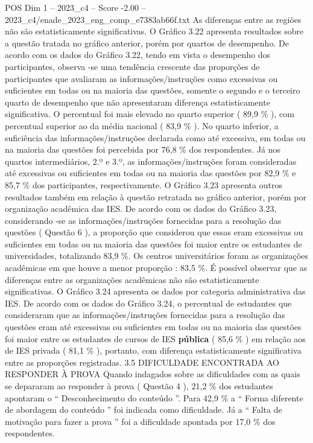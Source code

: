 \begin{textsample}{POS Dim 1 – 2023\_c4 – Score -2.00 – 2023\_c4/enade\_2023\_eng\_comp\_e7383ab66f.txt}
As diferenças entre as regiões não são estatisticamente significativas.
O Gráfico 3.22 apresenta resultados sobre a questão tratada no gráfico anterior, porém por quartos de desempenho.
De acordo com os dados do Gráfico 3.22, tendo em vista o desempenho dos participantes, observa -se uma tendência crescente das proporções de participantes que avaliaram as informações/instruções como excessivas ou suficientes em todas ou na maioria das questões, somente o segundo e o terceiro quarto de desempenho que não apresentaram diferença estatisticamente significativa.
O percentual foi mais elevado no quarto superior ( 89,9 \% ), com percentual superior ao da média nacional ( 83,9 \% ).
No quarto inferior, a suficiência das informações/instruções declarada como até excessiva, em todas ou na maioria das questões foi percebida por 76,8 \% dos respondentes.
Já nos quartos intermediários, 2.º e 3.º, as informações/instruções foram consideradas até excessivas ou suficientes em todas ou na maioria das questões por 82,9 \% e 85,7 \% dos participantes, respectivamente.
O Gráfico 3.23 apresenta outros resultados também em relação à questão retratada no gráfico anterior, porém por organização acadêmica das IES.
De acordo com os dados do Gráfico 3.23, considerando -se as informações/instruções fornecidas para a resolução das questões ( Questão 6 ), a proporção que considerou que essas eram excessivas ou suficientes em todas ou na maioria das questões foi maior entre os estudantes de universidades, totalizando 83,9 \%.
Os centros universitários foram as organizações acadêmicas em que houve a menor proporção : 83,5 \%.
É possível observar que as diferenças entre as organizações acadêmicas não são estatisticamente significativas.
O Gráfico 3.24 apresenta os dados por categoria administrativa das IES.
De acordo com os dados do Gráfico 3.24, o percentual de estudantes que consideraram que as informações/instruções fornecidas para a resolução das questões eram até excessivas ou suficientes em todas ou na maioria das questões foi maior entre os estudantes de cursos de IES \textbf{pública} ( 85,6 \% ) em relação aos de IES privada ( 81,1 \% ), portanto, com diferença estatisticamente significativa entre as proporções registradas. 3.5 DIFICULDADE ENCONTRADA AO RESPONDER À PROVA Quando indagados sobre as dificuldades com as quais se depararam ao responder à prova ( Questão 4 ), 21,2 \% dos estudantes apontaram o “ Desconhecimento do conteúdo ”.
Para 42,9 \% a “ Forma diferente de abordagem do conteúdo ” foi indicada como dificuldade.
Já a “ Falta de motivação para fazer a prova ” foi a dificuldade apontada por 17,0 \% dos respondentes.

\end{textsample}
